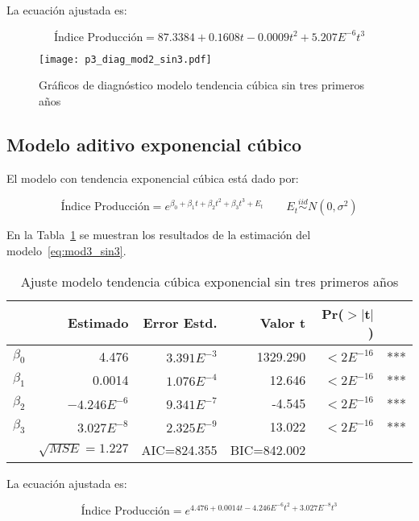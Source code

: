 \documentclass{tufte-handout}
\begin{document}
La ecuación ajustada es:

\begin{equation}
	\text{Índice Producción} = 87.3384 + 0.1608 t - 0.0009 t^2 + 5.207E^{-6} t^3
\end{equation}

\begin{figure*}[!ht]
    \texttt{[image: p3\_diag\_mod2\_sin3.pdf]}
    \caption{Gráficos de diagnóstico modelo tendencia cúbica sin tres primeros años}
    \label{fig:p3_diag_mod2_sin3.pdf}
\end{figure*}

\subsection*{Modelo aditivo exponencial cúbico}

El modelo con tendencia exponencial cúbica está dado por:

\begin{equation} \label{eq:mod3_sin3}
	\text{Índice Producción} = e^{\beta_0 + \beta_1 t + \beta_2 t^2 + \beta_3 t^3 + E_t}
	\qquad E_t \stackrel{iid}{\sim} N(0, \sigma^2)
\end{equation}

En la Tabla~\ref{tab:mod3_sin3} se muestran los resultados de la estimación del modelo~\ref{eq:mod3_sin3}.

\begin{table}[ht]
\centering
\begin{tabular}{lrrrrl}
          & Estimado & Error Estd. & Valor t & Pr($>$$|$t$|$) & \\ 
  \hline
$\beta_0$ & 4.476 & $3.391E^{-3}$ & 1329.290 & $<2E^{-16}$ & *** \\ 
  $\beta_1$ & 0.0014 & $1.076E^{-4}$ & 12.646 & $<2E^{-16}$ & *** \\ 
  $\beta_2$ & $-4.246E^{-6}$ & $9.341E^{-7}$ & -4.545 & $<2E^{-16}$ & *** \\ 
  $\beta_3$ & $3.027E^{-8}$ & $2.325E^{-9}$ & 13.022 & $<2E^{-16}$ & *** \\ 
   \hline
   & $\sqrt{MSE}=1.227$ & AIC=824.355 & BIC=842.002 & \\
   \hline
\end{tabular}
\caption{Ajuste modelo tendencia cúbica exponencial sin tres primeros años} 
\label{tab:mod3_sin3}
\end{table}

La ecuación ajustada es:

\begin{equation}
	\text{Índice Producción} = e^{4.476 + 0.0014 t - 4.246E^{-6} t^2 + 3.027E^{-8} t^3}
\end{equation}
\end{document}
